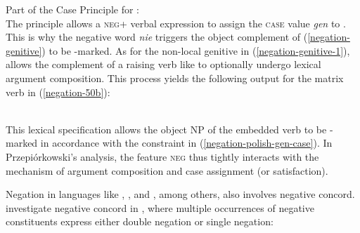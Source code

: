 \documentclass[output=paper
 	        ,biblatex
                ,babelshorthands
                ,newtxmath
                ,draftmode
                ,colorlinks, citecolor=brown
]{langscibook}
\begin{document}
\begin{exe}
\begin{xlist}
\ea
\label{negation-polish-gen-case}
Part of the Case Principle for :\\
  \impl
{}
\z
The principle allows a \textsc{neg}+ verbal expression to assign
 the \textsc{case} value \textit{gen} to .
%
This is why the negative word \emph{nie} triggers the object complement of
(\ref{negation-genitive}) to be \GEN-marked.
As for the non-local genitive in (\ref{negation-genitive-1}), \citet[]{Prz:00}
allows the  complement of a raising verb like  to optionally undergo lexical
argument composition. This process yields the following output for the
matrix verb in (\ref{negation-50b}):

\ea
\label{negation-polish-case}
\\
\z
%
This lexical specification allows the object NP of the embedded verb to be
-marked in accordance with the constraint in (\ref{negation-polish-gen-case}).
In Przepiórkowski's analysis, the feature
\textsc{neg} thus tightly interacts with the mechanism of argument composition and
 case assignment (or satisfaction).

Negation in languages like , , and , among others, also involves negative concord.
 investigate  negative concord in , where multiple occurrences
of negative constituents express either
double negation or single negation:


\end{xlist}
\end{exe}
\end{document}

